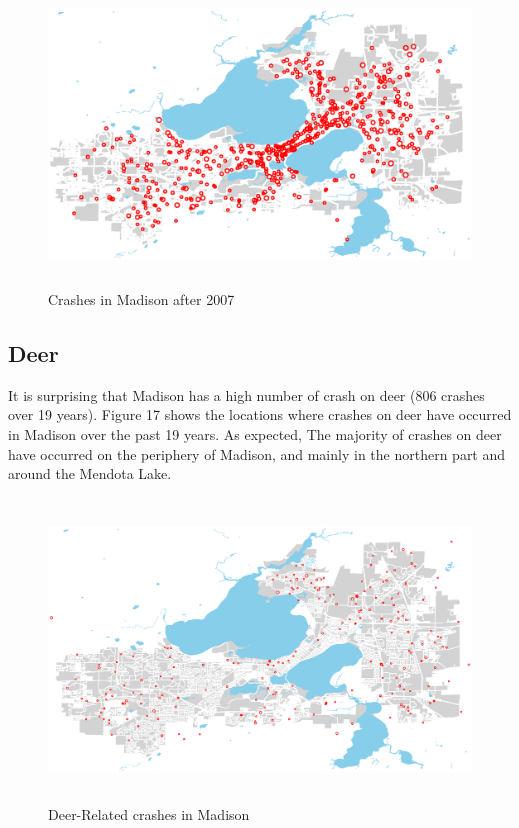 \documentclass[15pt]{article}
\begin{document}
\begin{figure}[H]
\raggedleft
\includegraphics[height=80mm]{year2.eps}
\caption{Crashes in Madison after 2007}
\end{figure}


\subsection{Deer}
It is surprising that Madison has a high number of crash on deer (806 crashes over 19 years). Figure 17 shows the locations where crashes on deer have occurred in Madison over the past 19 years. As expected, The majority of crashes on deer have occurred on the periphery of Madison, and mainly in the northern part and around the Mendota Lake.
\begin{figure}[H]
\raggedleft
\includegraphics[height=80mm]{deer.eps}
\caption{Deer-Related crashes in Madison}
\end{figure}
\end{document}
